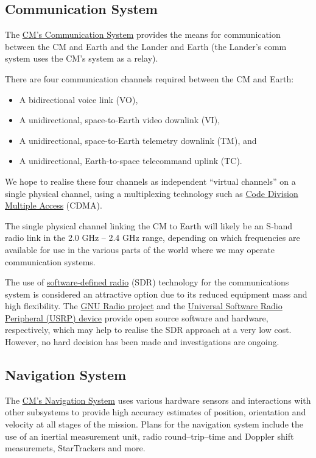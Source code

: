 \documentclass{report}
\begin{document}
\subsection{Communication System}

The \href{http://cstart.org/wiki/CLLARE_CM_Communication_System}{CM's Communication System} provides the means for communication between the CM and Earth and the Lander and Earth (the Lander's comm system uses the CM's system as a relay).

There are four communication channels required between the CM and Earth:
\begin{itemize}
\item A bidirectional voice link (VO),
\item A unidirectional, space-to-Earth video downlink (VI),
\item A unidirectional, space-to-Earth telemetry downlink (TM), and
\item A unidirectional, Earth-to-space telecommand uplink (TC).
\end{itemize}
We hope to realise these four channels as independent ``virtual channels'' on a single physical channel, using a multiplexing technology such as \href{http://en.wikipedia.org/wiki/Code_division_multiple_access}{Code Division Multiple Access} (CDMA).

The single physical channel linking the CM to Earth will likely be an S-band radio link in the 2.0 GHz -- 2.4 GHz range, depending on which frequencies are available for use in the various parts of the world where we may operate communication systems.

The use of \href{http://en.wikipedia.org/wiki/Software_defined_radio}{software-defined radio} (SDR) technology for the communications system is considered an attractive option due to its reduced equipment mass and high flexibility.  The \href{http://gnuradio.org/redmine/wiki/gnuradio}{GNU Radio project} and the \href{http://www.ettus.com/products}{Universal Software Radio Peripheral (USRP) device} provide open source software and hardware, respectively, which may help to realise the SDR approach at a very low cost.  However, no hard decision has been made and investigations are ongoing.

\subsection{Navigation System}

The \href{http://cstart.org/wiki/CLLARE_CM_Navigation_System}{CM's Navigation System} uses various hardware sensors and interactions with other subsystems to provide high accuracy estimates of position, orientation and velocity at all stages of the mission.  Plans for the navigation system include the use of an inertial measurement unit, radio round--trip--time and Doppler shift measuremets, StarTrackers and more.
\end{document}

